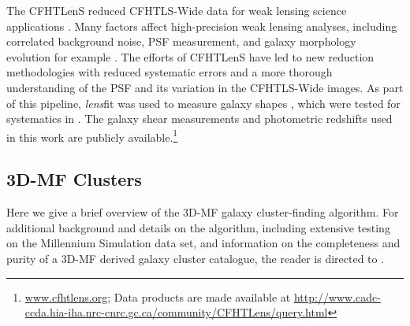 The \ac{CFHTLenS} reduced \ac{CFHTLS}-Wide data for weak lensing science applications \citep{Heymans12,Erben13}. Many factors affect high-precision weak lensing analyses, including correlated background noise, PSF measurement, and galaxy morphology evolution for example \citep[for a more detailed list and study, see][]{step2,Heymans12}. The efforts of \ac{CFHTLenS} have led to new reduction methodologies with reduced systematic errors and a more thorough understanding of the PSF and its variation in the \ac{CFHTLS}-Wide images. As part of this pipeline, {\em lens}fit was used to measure galaxy shapes \citep{Miller13}, which were tested for systematics in \citet{Heymans12}. The galaxy shear measurements and photometric redshifts used in this work are publicly available.\footnote[1]{\url{www.cfhtlens.org}; Data products are made available at \url{http://www.cadc-ccda.hia-iha.nrc-cnrc.gc.ca/community/CFHTLens/query.html}}


\subsection{\ac{3D-MF} Clusters}\label{3DMF}

Here we give a brief overview of the \ac{3D-MF} galaxy cluster-finding algorithm. For additional background and details on the algorithm, including extensive testing on the Millennium Simulation data set, and information on the completeness and purity of a \ac{3D-MF} derived galaxy cluster catalogue, the reader is directed to \citet{Milkeraitis10}.

